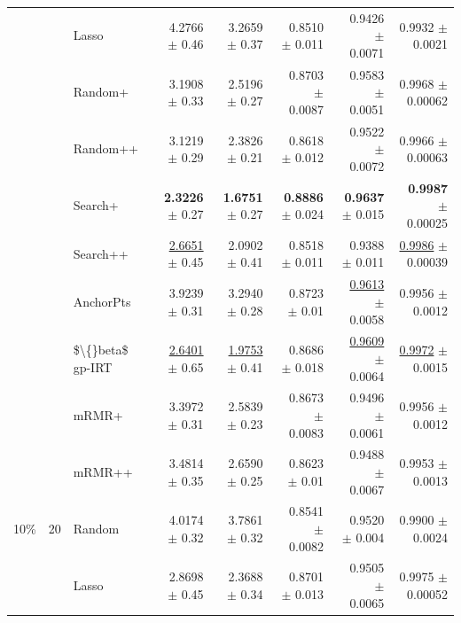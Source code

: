 \begin{longtable}{llp{}rrrrr}
 &  & Lasso & 4.2766 {\scriptsize $\pm$ 0.46} & 3.2659 {\scriptsize $\pm$ 0.37} & 0.8510 {\scriptsize $\pm$ 0.011} & 0.9426 {\scriptsize $\pm$ 0.0071} & 0.9932 {\scriptsize $\pm$ 0.0021} \\
 &  & Random+ & 3.1908 {\scriptsize $\pm$ 0.33} & 2.5196 {\scriptsize $\pm$ 0.27} & 0.8703 {\scriptsize $\pm$ 0.0087} & 0.9583 {\scriptsize $\pm$ 0.0051} & 0.9968 {\scriptsize $\pm$ 0.00062} \\
 &  & Random++ & 3.1219 {\scriptsize $\pm$ 0.29} & 2.3826 {\scriptsize $\pm$ 0.21} & 0.8618 {\scriptsize $\pm$ 0.012} & 0.9522 {\scriptsize $\pm$ 0.0072} & 0.9966 {\scriptsize $\pm$ 0.00063} \\
 &  & Search+ & \textbf{2.3226} {\scriptsize $\pm$ 0.27} & \textbf{1.6751} {\scriptsize $\pm$ 0.27} & \textbf{0.8886} {\scriptsize $\pm$ 0.024} & \textbf{0.9637} {\scriptsize $\pm$ 0.015} & \textbf{0.9987} {\scriptsize $\pm$ 0.00025} \\
 &  & Search++ & \underline{2.6651} {\scriptsize $\pm$ 0.45} & 2.0902 {\scriptsize $\pm$ 0.41} & 0.8518 {\scriptsize $\pm$ 0.011} & 0.9388 {\scriptsize $\pm$ 0.011} & \underline{0.9986} {\scriptsize $\pm$ 0.00039} \\
 &  & AnchorPts & 3.9239 {\scriptsize $\pm$ 0.31} & 3.2940 {\scriptsize $\pm$ 0.28} & 0.8723 {\scriptsize $\pm$ 0.01} & \underline{0.9613} {\scriptsize $\pm$ 0.0058} & 0.9956 {\scriptsize $\pm$ 0.0012} \\
 &  & \$\textbackslash\{\}beta\$ gp-IRT & \underline{2.6401} {\scriptsize $\pm$ 0.65} & \underline{1.9753} {\scriptsize $\pm$ 0.41} & 0.8686 {\scriptsize $\pm$ 0.018} & \underline{0.9609} {\scriptsize $\pm$ 0.0064} & \underline{0.9972} {\scriptsize $\pm$ 0.0015} \\
 &  & mRMR+ & 3.3972 {\scriptsize $\pm$ 0.31} & 2.5839 {\scriptsize $\pm$ 0.23} & 0.8673 {\scriptsize $\pm$ 0.0083} & 0.9496 {\scriptsize $\pm$ 0.0061} & 0.9956 {\scriptsize $\pm$ 0.0012} \\
 &  & mRMR++ & 3.4814 {\scriptsize $\pm$ 0.35} & 2.6590 {\scriptsize $\pm$ 0.25} & 0.8623 {\scriptsize $\pm$ 0.01} & 0.9488 {\scriptsize $\pm$ 0.0067} & 0.9953 {\scriptsize $\pm$ 0.0013} \\
\midrule
10\% & 20 & Random & 4.0174 {\scriptsize $\pm$ 0.32} & 3.7861 {\scriptsize $\pm$ 0.32} & 0.8541 {\scriptsize $\pm$ 0.0082} & 0.9520 {\scriptsize $\pm$ 0.004} & 0.9900 {\scriptsize $\pm$ 0.0024} \\
 &  & Lasso & 2.8698 {\scriptsize $\pm$ 0.45} & 2.3688 {\scriptsize $\pm$ 0.34} & 0.8701 {\scriptsize $\pm$ 0.013} & 0.9505 {\scriptsize $\pm$ 0.0065} & 0.9975 {\scriptsize $\pm$ 0.00052} \\

\end{longtable}
